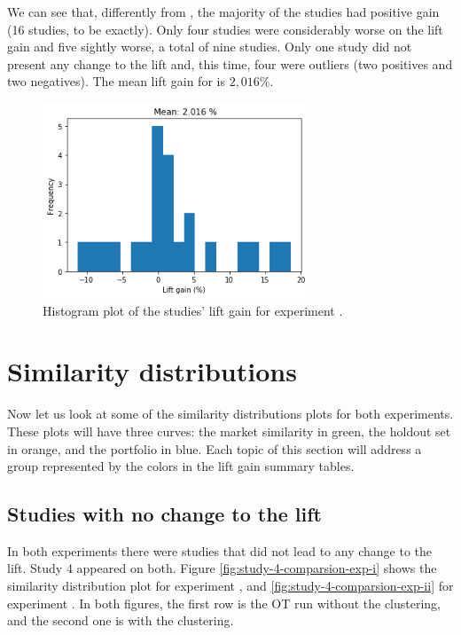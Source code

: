 We can see that, differently from \nameExperimentI{}, the majority of the studies had positive gain (16 studies, to be exactly). Only four studies were considerably worse on the lift gain and five sightly worse, a total of nine studies. Only one study did not present any change to the lift and, this time, four were outliers (two positives and two negatives). The mean lift gain for \nameExperimentII{} is $2,016 \%$.

\begin{figure}[!ht]
   \centering
   \includegraphics[width=8cm]{fig/ch4-lift-hist-plot-exp-ii.png}
   \caption{Histogram plot of the studies' lift gain for experiment \nameExperimentII{}.}
   \label{fig:lift-hist-plot-exp-ii}
\end{figure}

\section{Similarity distributions}
\label{ch:simi-distis}

Now let us look at some of the similarity distributions plots for both experiments. These plots will have three curves: the market similarity in green, the holdout set in orange, and the portfolio in blue. Each topic of this section will address a group represented by the colors in the lift gain summary tables. 

\subsection{Studies with no change to the lift}

In both experiments there were studies that did not lead to any change to the lift. Study 4 appeared on both. Figure \ref{fig:study-4-comparsion-exp-i} shows the similarity distribution plot for experiment \nameExperimentI{}, and \ref{fig:study-4-comparsion-exp-ii} for experiment \nameExperimentII{}. In both figures, the first row is the OT run without the clustering, and the second one is with the clustering. %

